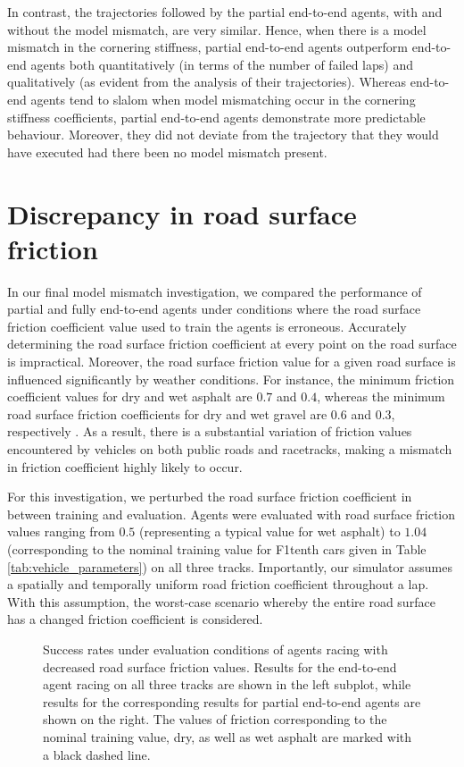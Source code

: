 In contrast, the trajectories followed by the partial end-to-end agents, with and without the model mismatch, are very similar.
Hence, when there is a model mismatch in the cornering stiffness, partial end-to-end agents outperform end-to-end agents both quantitatively (in terms of the number of failed laps) and qualitatively (as evident from the analysis of their trajectories).
Whereas end-to-end agents tend to slalom when model mismatching occur in the cornering stiffness coefficients, partial end-to-end agents demonstrate more predictable behaviour.
Moreover, they did not deviate from the trajectory that they would have executed had there been no model mismatch present.


\section{Discrepancy in road surface friction}

In our final model mismatch investigation, we compared the performance of partial and fully end-to-end agents under conditions where the road surface friction coefficient value used to train the agents is erroneous.
Accurately determining the road surface friction coefficient at every point on the road surface is impractical.
Moreover, the road surface friction value for a given road surface is influenced significantly by weather conditions.
For instance, the minimum friction coefficient values for dry and wet asphalt are $0.7$ and $0.4$, whereas the minimum road surface friction coefficients for dry and wet gravel are $0.6$ and $0.3$, respectively \cite{Novikov2018}. 
As a result, there is a substantial variation of friction values encountered by vehicles on both public roads and racetracks, making a mismatch in friction coefficient highly likely to occur.

For this investigation, we perturbed the road surface friction coefficient in between training and evaluation.
Agents were evaluated with road surface friction values ranging from $0.5$ (representing a typical value for wet asphalt) to $1.04$ (corresponding to the nominal training value for F1tenth cars given in Table \ref{tab:vehicle_parameters}) on all three tracks. 
Importantly, our simulator assumes a spatially and temporally uniform road friction coefficient throughout a lap.
With this assumption, the worst-case scenario whereby the entire road surface has a changed friction coefficient is considered.

\begin{figure}[b]
    \centering
    
    \caption[Success rate of agents under evaluation conditions with mismatched road surface friction coefficient]{Success rates under evaluation conditions of agents racing with decreased road surface friction values. Results for the end-to-end agent racing on all three tracks are shown in the left subplot, while results for the corresponding results for partial end-to-end agents are shown on the right. The values of friction corresponding to the nominal training value, dry, as well as wet asphalt are marked with a black dashed line.}
    \label{fig:mu}
\end{figure}



